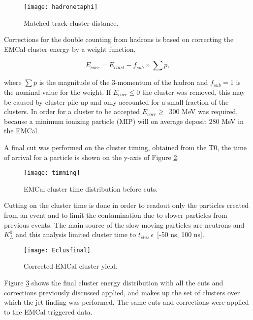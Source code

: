 \begin{figure}[h]
\texttt{[image: hadronetaphi]}
\centering
\caption{Matched track-cluster distance.}
\label{fig:EMChadetaphi}
\end{figure}

\noindent
Corrections for the double counting from hadrons is based on correcting the EMCal cluster energy by a weight function,

\begin{equation}
E_{corr} = E_{clust} - f_{sub} \times \sum p ,
\label{eq:HadCorr}
\end{equation}

\noindent
where $\sum p$ is the magnitude of the 3-momentum of the hadron and $f_{sub} = 1$ is the nominal value for the weight.  If $E_{corr} \leq 0$ the cluster was removed, this may be caused by cluster pile-up and only accounted for a small fraction of the clusters.  In order for a cluster to be accepted $E_{corr} \geq \,$ 300 MeV was required, because a minimum ionizing particle (MIP) will on average deposit 280 MeV in the EMCal.  

A final cut was performed on the cluster timing, obtained from the T0, the time of arrival for a particle is shown on the y-axis of Figure \ref{fig:EMCaltime}.  

\begin{figure}[!h]
\texttt{[image: timming]}
\centering
\caption{EMCal cluster time distribution before cuts.}
\label{fig:EMCaltime}
\end{figure}


Cutting on the cluster time is done in order to readout only the particles created from an event and to limit the contamination due to slower particles from previous events.  The main source of the slow moving particles are neutrons and $K_{L}^{0}$ and this analysis limited cluster time to $t_{clus} \, \epsilon \,$ [-50 ns, 100 ns].


\begin{figure}[h]
\texttt{[image: Eclusfinal]}
\centering
\caption{Corrected EMCal cluster yield.}
\label{fig:EMCalfinal}
\end{figure}
\newpage

Figure \ref{fig:EMCalfinal} shows the final cluster energy distribution with all the cuts and corrections previously discussed applied, and makes up the set of clusters over which the jet finding was performed.  The same cuts and corrections were applied to the EMCal triggered data.

